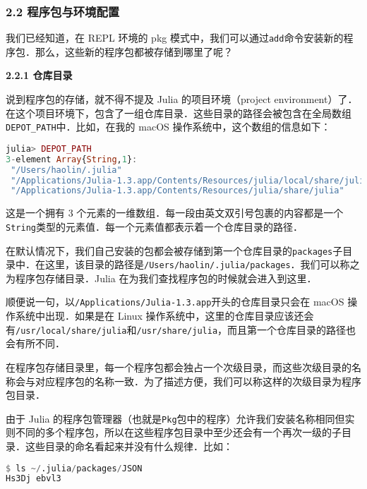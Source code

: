 
\subsubsection{2.2 程序包与环境配置}

我们已经知道，在 REPL 环境的 pkg 模式中，我们可以通过\verb|add|命令安装新的程序包．那么，这些新的程序包都被存储到哪里了呢？

\textbf{2.2.1 仓库目录}

说到程序包的存储，就不得不提及 Julia 的项目环境（project environment）了．在这个项目环境下，包含了一组仓库目录．这些目录的路径会被包含在全局数组\verb|DEPOT_PATH|中．比如，在我的 macOS 操作系统中，这个数组的信息如下：

\begin{lstlisting}[language=julia]
julia> DEPOT_PATH
3-element Array{String,1}:
 "/Users/haolin/.julia"                                                  
 "/Applications/Julia-1.3.app/Contents/Resources/julia/local/share/julia"
 "/Applications/Julia-1.3.app/Contents/Resources/julia/share/julia" 
\end{lstlisting}

这是一个拥有 3 个元素的一维数组．每一段由英文双引号包裹的内容都是一个\verb|String|类型的元素值．每一个元素值都表示着一个仓库目录的路径．

在默认情况下，我们自己安装的包都会被存储到第一个仓库目录的\verb|packages|子目录中．在这里，该目录的路径是\verb|/Users/haolin/.julia/packages|．我们可以称之为程序包存储目录．Julia 在为我们查找程序包的时候就会进入到这里．

顺便说一句，以\verb|/Applications/Julia-1.3.app|开头的仓库目录只会在 macOS 操作系统中出现．如果是在 Linux 操作系统中，这里的仓库目录应该还会有\verb|/usr/local/share/julia|和\verb|/usr/share/julia|，而且第一个仓库目录的路径也会有所不同．

在程序包存储目录里，每一个程序包都会独占一个次级目录，而这些次级目录的名称会与对应程序包的名称一致．为了描述方便，我们可以称这样的次级目录为程序包目录．

由于 Julia 的程序包管理器（也就是\verb|Pkg|包中的程序）允许我们安装名称相同但实则不同的多个程序包，所以在这些程序包目录中至少还会有一个再次一级的子目录．这些目录的命名看起来并没有什么规律．比如：

\begin{lstlisting}[language=julia]
$ ls ~/.julia/packages/JSON
Hs3Dj ebvl3
\end{lstlisting}

